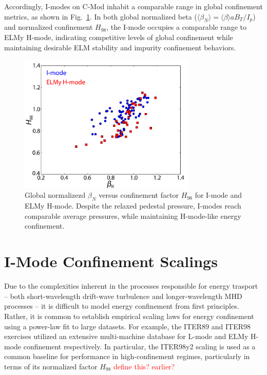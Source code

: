 \documentclass[12pt]{iopart}
\renewcommand{\note}[1]{\textcolor{red}{#1}}
\begin{document}
Accordingly, I-modes on C-Mod inhabit a comparable range in global confinement metrics, as shown in Fig.~\ref{fig:betan_H}.  In both global normalized beta ($\langle \beta_N \rangle = \langle \beta \rangle aB_T/I_p$) and normalized confinement $H_{98}$, the I-mode occupies a comparable range to ELMy H-mode, indicating competitive levels of global confinement while maintaining desirable ELM stability and impurity confinement behaviors.

\begin{figure}[ht]
 \centering
 \includegraphics[width=0.75\textwidth]{betan_H_i_e.pdf}
 \caption{Global normalizezd $\beta_N$ versus confinement factor $H_{98}$ for I-mode and ELMy H-mode.  Despite the relaxed pedestal pressure, I-modes reach comparable average pressures, while maintaining H-mode-like energy confinement.}
 \label{fig:betan_H}
\end{figure}

\section{I-Mode Confinement Scalings}\label{sec:scalings}

Due to the complexities inherent in the processes responsible for energy trasport -- both short-wavelength drift-wave turbulence and longer-wavelength MHD processes -- it is difficult to model energy confinement from first principles.
Rather, it is common to establish empirical scaling laws for energy confinement using a power-law fit to large datasets.
For example, the ITER89 \cite{Yushmanov1990} and ITER98 \cite{ITER1999} exercises utilized an extensive multi-machine database \cite{Christiansen1992} for L-mode and ELMy H-mode confinement respectively.
In particular, the ITER98y2 scaling is used as a common baseline for performance in high-confinement regimes, particularly in terms of its normalized factor $H_{98}$ \note{define this?  earlier?}
\end{document}

